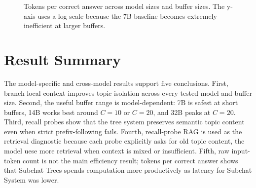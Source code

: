 \begin{figure}[htbp]
\centering
{}
\caption{Tokens per correct answer across model sizes and buffer sizes. The y-axis uses a log scale because the 7B baseline becomes extremely inefficient at larger buffers.}
\label{fig:tpca_buffer_all}
\end{figure}

\section{Result Summary}\label{subsec:findings_summary}

The model-specific and cross-model results support five conclusions. First, branch-local context improves topic isolation across every tested model and buffer size. Second, the useful buffer range is model-dependent: 7B is safest at short buffers, 14B works best around $C=10$ or $C=20$, and 32B peaks at $C=20$. Third, recall probes show that the tree system preserves semantic topic content even when strict prefix-following fails. Fourth, recall-probe RAG is used as the retrieval diagnostic because each probe explicitly asks for old topic content, the model uese more retrieval when context is mixed or insufficient. Fifth, raw input-token count is not the main efficiency result; tokens per correct answer shows that Subchat Trees spends computation more productively as latency for Subchat System was lower.

